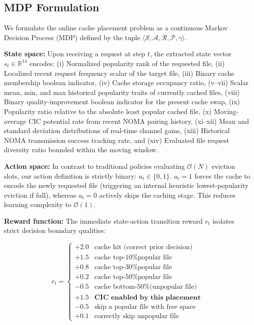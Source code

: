 \documentclass[conference]{IEEEtran}
\begin{document}
\subsection{MDP Formulation}
We formulate the online cache placement problem as a continuous Markov Decision Process (MDP) defined by the tuple $\langle \mathcal{S}, \mathcal{A}, \mathcal{R}, \mathcal{P}, \gamma \rangle$.

\textbf{State space:} Upon receiving a request at step $t$, the extracted state vector $s_t \in \mathbb{R}^{14}$ encodes:
(i) Normalized popularity rank of the requested file,
(ii) Localized recent request frequency scalar of the target file,
(iii) Binary cache membership boolean indicator,
(iv) Cache storage occupancy ratio,
(v--vii) Scalar mean, min, and max historical popularity traits of currently cached files,
(viii) Binary quality-improvement boolean indicator for the present cache swap,
(ix) Popularity ratio relative to the absolute least popular cached file,
(x) Moving-average CIC potential rate from recent NOMA pairing history,
(xi--xii) Mean and standard deviation distributions of real-time channel gains,
(xiii) Historical NOMA transmission success tracking rate, and
(xiv) Evaluated file request diversity ratio bounded within the moving window.

\textbf{Action space:} In contrast to traditional policies evaluating $\mathcal{O}(N)$ eviction slots, our action definition is strictly binary: $a_t \in \{0, 1\}$. $a_t = 1$ forces the cache to encode the newly requested file (triggering an internal heuristic lowest-popularity eviction if full), whereas $a_t = 0$ actively skips the caching stage. This reduces learning complexity to $\mathcal{O}(1)$.

\textbf{Reward function:} The immediate state-action transition reward $r_t$ isolates strict decision boundary qualities:

\begin{equation}
r_t =
\begin{cases}
+2.0 & \text{cache hit (correct prior decision)} \\
+1.5 & \text{cache top-10\% popular file} \\
+0.8 & \text{cache top-30\% popular file} \\
+0.2 & \text{cache top-50\% popular file} \\
-0.5 & \text{cache bottom-50\% (unpopular file)} \\
+1.5 & \textbf{CIC enabled by this placement} \\
-0.5 & \text{skip a popular file with free space} \\
+0.1 & \text{correctly skip unpopular file}
\end{cases}
\label{eq:reward}
\end{equation}
\end{document}
